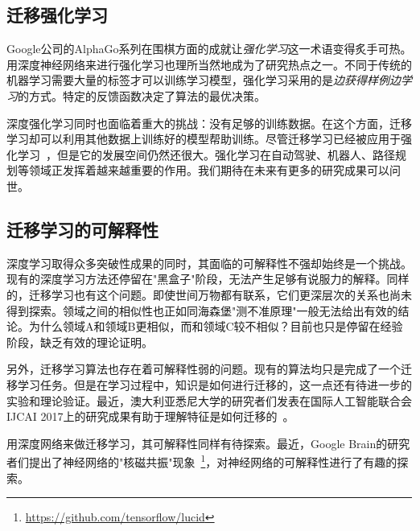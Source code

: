 \subsection{迁移强化学习}

Google公司的AlphaGo系列在围棋方面的成就让\textit{强化学习}这一术语变得炙手可热。用深度神经网络来进行强化学习也理所当然地成为了研究热点之一。不同于传统的机器学习需要大量的标签才可以训练学习模型，强化学习采用的是\textit{边获得样例边学习}的方式。特定的反馈函数决定了算法的最优决策。

深度强化学习同时也面临着重大的挑战：没有足够的训练数据。在这个方面，迁移学习却可以利用其他数据上训练好的模型帮助训练。尽管迁移学习已经被应用于强化学习~\cite{taylor2009transfer}，但是它的发展空间仍然还很大。强化学习在自动驾驶、机器人、路径规划等领域正发挥着越来越重要的作用。我们期待在未来有更多的研究成果可以问世。

\subsection{迁移学习的可解释性}

深度学习取得众多突破性成果的同时，其面临的可解释性不强却始终是一个挑战。现有的深度学习方法还停留在"黑盒子"阶段，无法产生足够有说服力的解释。同样的，迁移学习也有这个问题。即使世间万物都有联系，它们更深层次的关系也尚未得到探索。领域之间的相似性也正如同海森堡"测不准原理"一般无法给出有效的结论。为什么领域A和领域B更相似，而和领域C较不相似？目前也只是停留在经验阶段，缺乏有效的理论证明。

另外，迁移学习算法也存在着可解释性弱的问题。现有的算法均只是完成了一个迁移学习任务。但是在学习过程中，知识是如何进行迁移的，这一点还有待进一步的实验和理论验证。最近，澳大利亚悉尼大学的研究者们发表在国际人工智能联合会IJCAI 2017上的研究成果有助于理解特征是如何迁移的~\cite{liu2017understanding}。

用深度网络来做迁移学习，其可解释性同样有待探索。最近，Google Brain的研究者们提出了神经网络的"核磁共振"现象~\footnote{\url{https://github.com/tensorflow/lucid}}，对神经网络的可解释性进行了有趣的探索。

